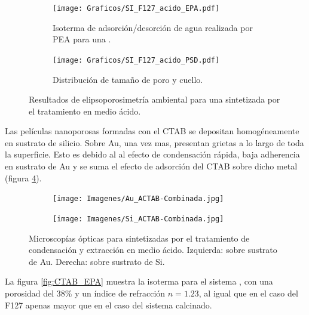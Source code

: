 {		\begin{figure}[!ht]
		  	\begin{subfigure}[t]{0.495\textwidth}
		  	\texttt{[image: Graficos/SI\_F127\_acido\_EPA.pdf]}
			\caption{Isoterma de adsorción/desorción de agua realizada por PEA para una \pdmF.}
			\label{fig:F127_acido_EPA}
			\end{subfigure}
			\begin{subfigure}[t]{0.495\textwidth}
		  	\texttt{[image: Graficos/SI\_F127\_acido\_PSD.pdf]}
			\caption{Distribución de tamaño de poro y cuello.\\ }
			\label{fig:F127_acido_PSD}
			\end{subfigure}
			\caption[Elipsoporosimetría \pdmF\space tratamiento ácido.]{Resultados de elipsoporosimetría ambiental para una \pdmF\space sintetizada por el tratamiento en medio ácido.}
			\end{figure}

		Las películas nanoporosas formadas con el CTAB se depositan homogéneamente en sustrato de silicio. Sobre Au, una vez mas, presentan grietas a lo largo de toda la superficie. Esto es debido al al efecto de condensación rápida, baja adherencia en sustrato de Au y se suma el efecto de adsorción del CTAB sobre dicho metal (figura \ref{fig:Microscopia_CTAB_acido}). 

		\begin{figure}[!th]
 	   	    \begin{subfigure}[t]{0.49\textwidth}
	       	\texttt{[image: Imagenes/Au\_ACTAB-Combinada.jpg]}
	   		\end{subfigure}
	   		\begin{subfigure}[t]{0.49\textwidth}
	   	    \texttt{[image: Imagenes/Si\_ACTAB-Combinada.jpg]}
	   		\end{subfigure}
			 \caption[Microscopía óptica \pdmC tratamiento en medio ácido.]{Microscopías ópticas para \pdmC\space sintetizadas por el tratamiento de condensación y extracción en medio ácido. Izquierda: sobre sustrato de Au. Derecha: sobre sustrato de Si.}
			 \label{fig:Microscopia_CTAB_acido}	
		     \end{figure}	

		La figura \ref{fig:CTAB_EPA} muestra la isoterma para el sistema \pdmC, con una porosidad del 38\% y un índice de refracción $n=1.23$, al igual que en el caso del F127 apenas mayor que en el caso del sistema calcinado.

}
